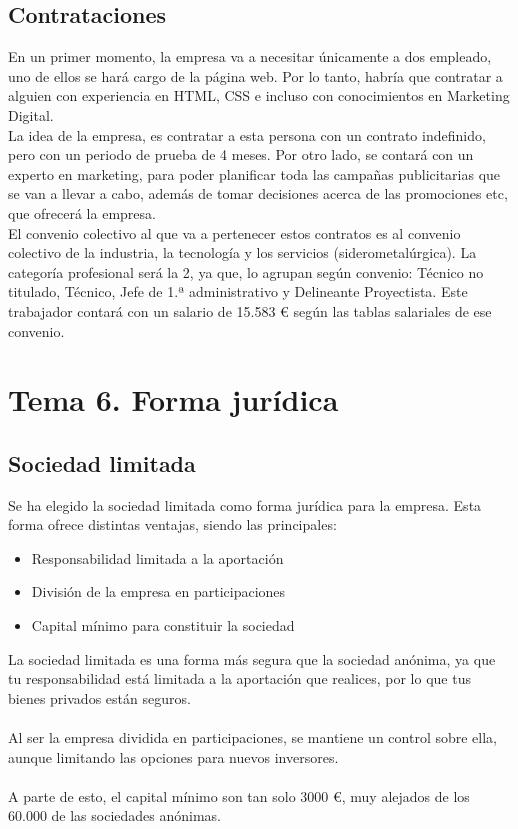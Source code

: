 \documentclass[openany,overnay,a4paper, twoside, 12pt]{book}
\begin{document}
\section{Contrataciones}
En un primer momento, la empresa va a necesitar únicamente a dos empleado, uno de ellos  se hará cargo de la página web. Por lo tanto, habría que contratar a alguien con experiencia en HTML, CSS e incluso con conocimientos en Marketing Digital. \\La idea de la empresa, es contratar a esta persona con un contrato indefinido, pero con un periodo de prueba de 4 meses. Por otro lado, se contará con un experto en marketing, para poder planificar toda las campañas publicitarias que se van a llevar a cabo, además de tomar decisiones acerca de las promociones etc, que ofrecerá la empresa.
\\El convenio colectivo al que va a pertenecer estos contratos es al convenio colectivo de la industria, la tecnología y los servicios (siderometalúrgica). La categoría profesional será la 2, ya que, lo agrupan según convenio: Técnico no titulado, Técnico, Jefe de 1.ª administrativo y Delineante Proyectista.
Este trabajador contará con un salario de 15.583 € según las tablas salariales de ese convenio.

\setcounter{chapter}{6}
\chapter*{Tema 6. Forma jurídica}
\setcounter{section}{0}
\section{Sociedad limitada}
Se ha elegido la sociedad limitada como forma jurídica para la empresa. Esta forma ofrece distintas ventajas, siendo las principales:
\begin{itemize}
    \item Responsabilidad limitada a la aportación
    \item División de la empresa en participaciones
    \item Capital mínimo para constituir la sociedad
\end{itemize}
La sociedad limitada es una forma más segura que la sociedad anónima, ya que tu responsabilidad está limitada a la aportación que realices, por lo que tus bienes privados están seguros.\\\\ Al ser la empresa dividida en participaciones, se mantiene un control sobre ella, aunque limitando las opciones para nuevos inversores. \\\\
A parte de esto, el capital mínimo son tan solo 3000 €, muy alejados de los 60.000 de las sociedades anónimas. 
\end{document}
